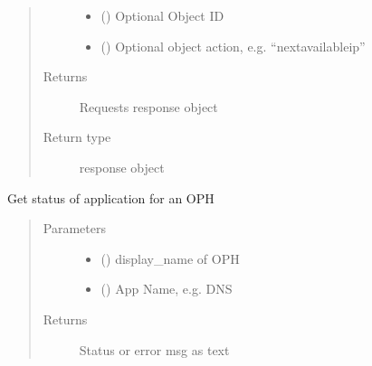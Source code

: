 \documentclass[letterpaper,10pt,english]{sphinxmanual}
\begin{document}
\begin{fulllineitems}
\begin{fulllineitems}
\begin{quote}
\begin{description}
\begin{itemize}
\item {} 
\sphinxAtStartPar
{} () \textendash{} Optional Object ID

\item {} 
\sphinxAtStartPar
{} () \textendash{} Optional object action, e.g. “nextavailableip”

\end{itemize}

\item[{Returns}] \leavevmode
\sphinxAtStartPar
Requests response object

\item[{Return type}] \leavevmode
\sphinxAtStartPar
response object

\end{description}\end{quote}

\end{fulllineitems}


\begin{fulllineitems}
\label{\detokenize{b1oph-class:bloxone.b1oph.get_app_state}}
\sphinxAtStartPar
Get status of application for an OPH
\begin{quote}\begin{description}
\item[{Parameters}] \leavevmode\begin{itemize}
\item {} 
\sphinxAtStartPar
{} () \textendash{} display\_name of OPH

\item {} 
\sphinxAtStartPar
{} () \textendash{} App Name, e.g. DNS

\end{itemize}

\item[{Returns}] \leavevmode
\sphinxAtStartPar
Status or error msg as text


\end{description}
\end{quote}
\end{fulllineitems}
\end{fulllineitems}
\end{document}
